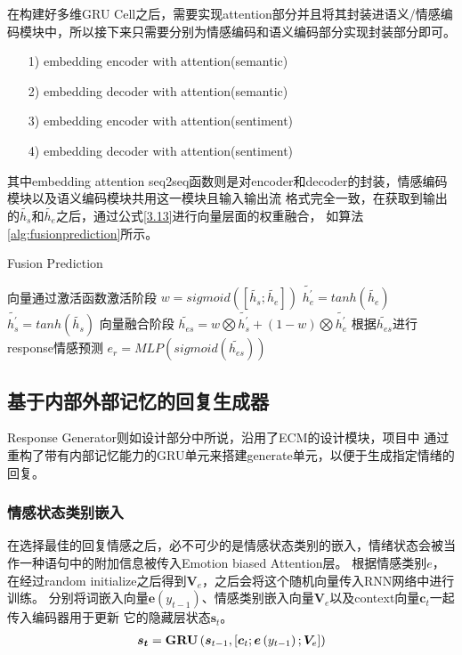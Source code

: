 \documentclass[supercite]{HustGraduPaper}
\theoremstyle{definition}
\begin{document}
在构建好多维GRU Cell之后，需要实现attention部分并且将其封装进语义/情感编码模块中，所以接下来只需要分别为情感编码和语义编码部分实现封装部分即可。
\begin{itemize}
  \item [1)]embedding encoder with attention(semantic)
  \item [2)]embedding decoder with attention(semantic)
  \item [3)]embedding encoder with attention(sentiment)
  \item [4)]embedding decoder with attention(sentiment)
\end{itemize}

其中embedding attention seq2seq函数则是对encoder和decoder的封装，情感编码模块以及语义编码模块共用这一模块且输入输出流
格式完全一致，在获取到输出的$\widetilde{h_s}$和$\widetilde{h_e}$之后，通过公式\ref{3.13}进行向量层面的权重融合，
如算法\ref{alg:fusionprediction}所示。
\begin{algorithm}
  \caption{Fusion Prediction}
  \label{alg:fusionprediction}
  \begin{algorithmic}
      \State 向量通过激活函数激活阶段
      \State $w = sigmoid([\widetilde{h_s};\widetilde{h_e}])$
      \State ${\widetilde{h_e^{'}}} = tanh(\widetilde{h_e})$
      \State ${\widetilde{h_s^{'}}} = tanh(\widetilde{h_s})$
      \State 向量融合阶段
      \State ${\widetilde{h_{es}}} = w \bigotimes {\widetilde{h_s^{'}}} + (1 - w) \bigotimes {\widetilde{h_e^{'}}}$
      \State 根据$\widetilde{h_{es}}$进行response情感预测
      \State $e_r = MLP(sigmoid(\widetilde{h_{es}}))$
  \end{algorithmic}
\end{algorithm}

\subsection{基于内部外部记忆的回复生成器}
Response Generator则如设计部分中所说，沿用了ECM\cite{DBLP:journals/corr/ZhouHZZL17}的设计模块，项目中
通过重构了带有内部记忆能力的GRU单元来搭建generate单元，以便于生成指定情绪的回复。

\subsubsection{情感状态类别嵌入}
在选择最佳的回复情感之后，必不可少的是情感状态类别的嵌入，情绪状态会被当作一种语句中的附加信息被传入Emotion biased Attention层。
根据情感类别$e$，在经过random initialize之后得到$\boldsymbol{V}_e$，之后会将这个随机向量传入RNN网络中进行训练。
分别将词嵌入向量$\boldsymbol{e}(y_{t-1})$、情感类别嵌入向量$\boldsymbol{V}_e$以及context向量$\boldsymbol{c}_t$一起传入编码器用于更新
它的隐藏层状态$\boldsymbol{s}_t$。
\begin{align}
  \boldsymbol { s } _ { \boldsymbol { t } } = \mathbf { G } \mathbf { R } \mathbf { U } \left( \boldsymbol { s } _ { t - 1 } , \left[ \boldsymbol { c } _ { t } ; \boldsymbol { e } \left( y _ { t - 1 } \right) ; \boldsymbol { V } _ { e } \right] \right) \notag
\end{align}
\end{document}
